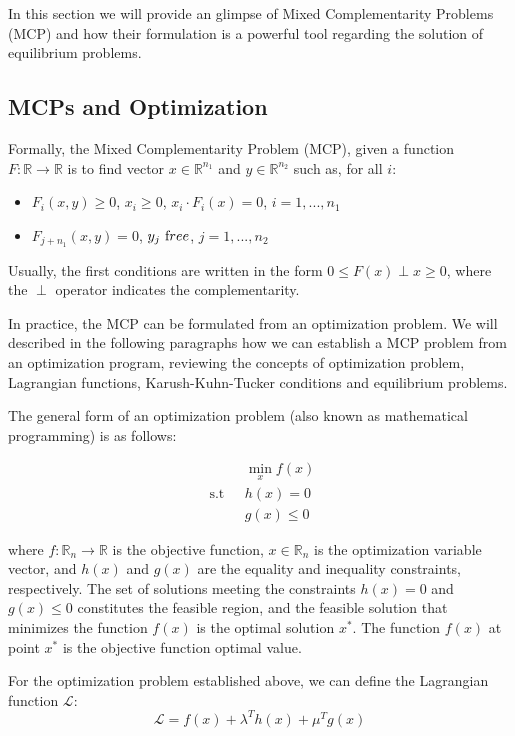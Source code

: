 \documentclass[11pt, letterpaper]{article}
\begin{document}
In this section we will provide an glimpse of Mixed Complementarity Problems (MCP) and how their formulation is a powerful tool regarding the solution of equilibrium problems. 

\subsection{MCPs and Optimization}

Formally, the Mixed Complementarity Problem (MCP), given a function $F: \mathbb{R} \longrightarrow \mathbb{R} $ is to find vector $x \in \mathbb{R}^{n_1}$ and $y \in \mathbb{R}^{n_2}$ such as, for all $i$:
\begin{itemize}
    \item $F_i(x,y) \geq  0$, $x_i \geq 0$, $x_i \cdot F_i(x) = 0 $, $i=1,..., n_1$
    \item  $F_{j+n_1}(x,y) = 0$, $y_j \ {\textrm free}$, $j=1,...,n_2$
\end{itemize}

Usually, the first conditions are written in the form $ 0 \leq F(x) \perp x \geq 0$, where the $\perp$ operator indicates the complementarity.

In practice, the MCP can be formulated from an optimization problem. We will described in the following paragraphs how we can establish a MCP problem from an optimization program, reviewing the concepts of optimization problem, Lagrangian functions, Karush-Kuhn-Tucker conditions and equilibrium problems.

The general form of an optimization problem (also known as mathematical programming) is as follows:

\begin{align} \label{eq:opt}
         & \min_x f(x)  \\
    \textrm{ s.t} \ \ \  & h(x) = 0 \\
        \ \ \  & g(x) \leq 0
\end{align}

where $f: \mathbb{R}_n \longrightarrow \mathbb{R}$ is the objective function, $x \in \mathbb{R}_n$ is the optimization variable vector, and $h(x)$ and $g(x)$ are the equality and  inequality constraints, respectively. The set of solutions meeting the constraints $h(x) = 0$ and $g(x) \leq 0$ constitutes the feasible region, and the feasible solution that minimizes the function $f(x)$ is the optimal solution $x^{*}$. The function $f(x)$ at point $x^{*}$ is the objective function optimal value.

For the optimization problem established above, we can define the Lagrangian function $\mathcal{L}$:
\begin{equation}
     \mathcal{L} = f(x) + \lambda^{T} h(x) + \mu^{T} g(x)
\end{equation}
\end{document}
